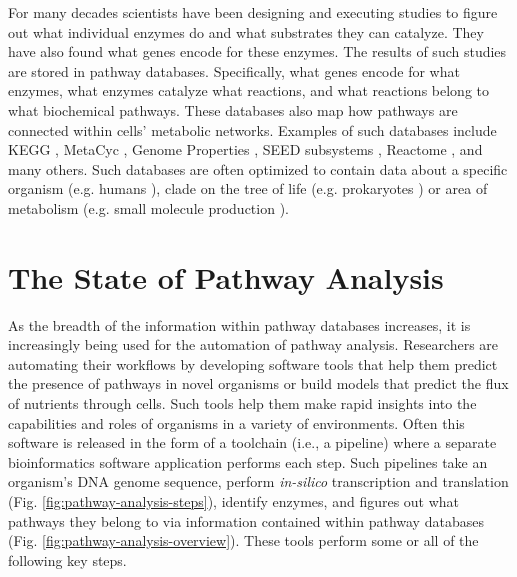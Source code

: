 For many decades scientists have been designing and executing studies to figure out what individual enzymes do and what substrates they can catalyze. They have also found what genes encode for these enzymes. The results of such studies are stored in pathway databases. Specifically, what genes encode for what enzymes, what enzymes catalyze what reactions, and what reactions belong to what biochemical pathways. These databases also map how pathways are connected within cells' metabolic networks. Examples of such databases include KEGG \cite{kanehisa2000kegg}, MetaCyc \cite{karp2002metacyc}, Genome Properties \cite{richardson2018genome}, SEED subsystems \cite{overbeek2005subsystems}, Reactome \cite{croft2013reactome}, and many others. Such databases are often optimized to contain data about a specific organism (e.g. humans \cite{croft2013reactome}), clade on the tree of life (e.g. prokaryotes \cite{richardson2018genome}) or area of metabolism (e.g. small molecule production \cite{Jewison2014}).

\section{The State of Pathway Analysis}

As the breadth of the information within pathway databases increases, it is increasingly being used for the automation of pathway analysis. Researchers are automating their workflows by developing software tools that help them predict the presence of pathways in novel organisms or build models that predict the flux of nutrients through cells. Such tools help them make rapid insights into the capabilities and roles of organisms in a variety of environments. Often this software is released in the form of a toolchain (i.e., a pipeline) where a separate bioinformatics software application performs each step. Such pipelines take an organism's DNA genome sequence, perform \textit{in-silico} transcription and translation (Fig. \ref{fig:pathway-analysis-steps}), identify enzymes, and figures out what pathways they belong to via information contained within pathway databases (Fig. \ref{fig:pathway-analysis-overview}). These tools perform some or all of the following key steps.


